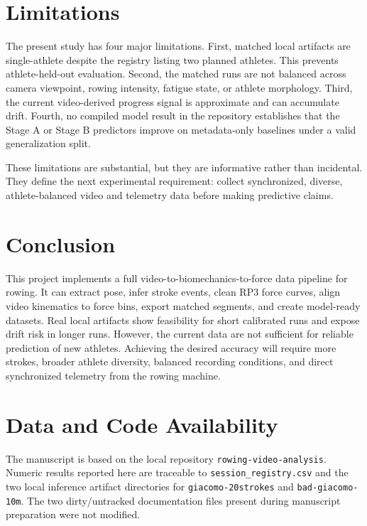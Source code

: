 \documentclass[11pt]{article}
\begin{document}
\section{Limitations}
The present study has four major limitations. First, matched local artifacts are single-athlete despite the registry listing two planned athletes. This prevents athlete-held-out evaluation. Second, the matched runs are not balanced across camera viewpoint, rowing intensity, fatigue state, or athlete morphology. Third, the current video-derived progress signal is approximate and can accumulate drift. Fourth, no compiled model result in the repository establishes that the Stage A or Stage B predictors improve on metadata-only baselines under a valid generalization split.

These limitations are substantial, but they are informative rather than incidental. They define the next experimental requirement: collect synchronized, diverse, athlete-balanced video and telemetry data before making predictive claims.

\section{Conclusion}
This project implements a full video-to-biomechanics-to-force data pipeline for rowing. It can extract pose, infer stroke events, clean RP3 force curves, align video kinematics to force bins, export matched segments, and create model-ready datasets. Real local artifacts show feasibility for short calibrated runs and expose drift risk in longer runs. However, the current data are not sufficient for reliable prediction of new athletes. Achieving the desired accuracy will require more strokes, broader athlete diversity, balanced recording conditions, and direct synchronized telemetry from the rowing machine.

\section*{Data and Code Availability}
The manuscript is based on the local repository \texttt{rowing-video-analysis}. Numeric results reported here are traceable to \texttt{session\_registry.csv} and the two local inference artifact directories for \texttt{giacomo-20strokes} and \texttt{bad-giacomo-10m}. The two dirty/untracked documentation files present during manuscript preparation were not modified.



\end{document}
